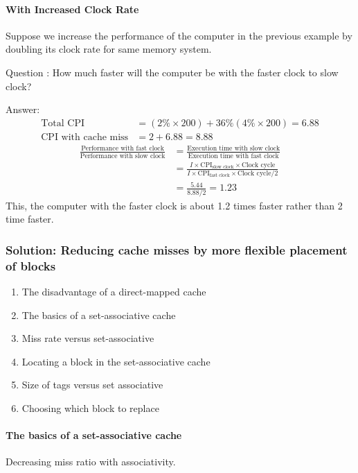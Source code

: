 \paragraph{With Increased Clock Rate}
{\small Suppose we increase the performance of the computer in the previous example by doubling its clock rate for same memory system.}

Question : How much faster will the computer be with the faster clock to slow clock?

Answer:{
    \small
    \begin{align*}
        \text{Total CPI}&=(2\%\times 200)+36\%(4\%\times200)=6.88\\
        \text{CPI with cache miss}&=2+6.88=8.88
    \end{align*}
    \begin{align*}
        \frac{\text{Performance with fast clock}}{\text{Performance with slow clock}}&=\frac{\text{Execution time with slow clock}}{\text{Execution time with fast clock}}\\
        &=\frac{I\times \text{CPI}_{\text{slow clock}}\times \text{Clock cycle}}{I\times \text{CPI}_{\text{fast clock}}\times \text{Clock cycle}/2}\\
        &=\frac{5.44}{8.88/2}=1.23
    \end{align*}
    This, the computer with the faster clock is about 1.2 times faster rather than 2 time faster.
}

\subsubsection{Solution: Reducing cache misses by more flexible placement of blocks}
\begin{enumerate}\small
    \item The disadvantage of a direct-mapped cache
    \item The basics of a set-associative cache
    \item Miss rate versus set-associative
    \item Locating a block in the set-associative cache
    \item Size of tags versus set associative
    \item Choosing which block to replace
\end{enumerate}

\paragraph{The basics of a set-associative cache}
Decreasing miss ratio with associativity. 

